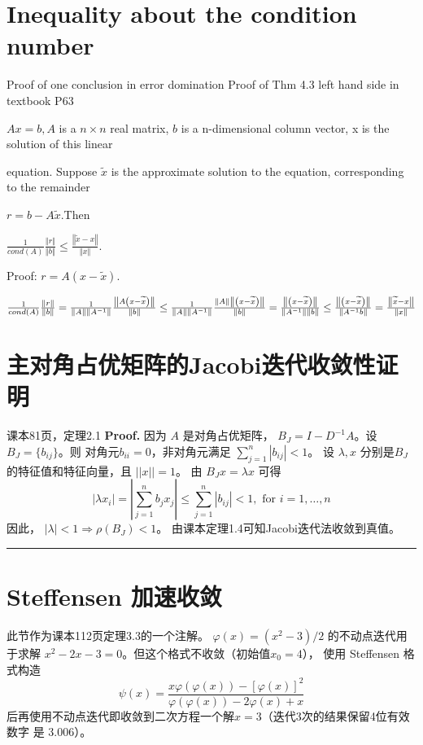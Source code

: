\documentclass{article}
\newenvironment{proof}[1][Proof]{\noindent\textbf{#1.} }{\ \rule{0.5em}{0.5em}}
\begin{document}
\section{Inequality about the condition number}
Proof of one conclusion in error domination
Proof of Thm 4.3 left hand side in textbook P63

$Ax=b,A$ is a $n\times n$ real matrix, $b$ is a n-dimensional column vector,
x is the solution of this linear

equation. Suppose $\widetilde{x}$ is the approximate solution to the
equation, corresponding to the remainder 

$r=b-A\widetilde{x}.$Then 

$\frac{1}{cond(A)}\frac{\left\Vert r\right\Vert }{\left\Vert b\right\Vert }%
\leq \frac{\left\Vert \widetilde{x}-x\right\Vert }{\left\Vert x\right\Vert }.
$

Proof: $r=A\left( x-\widetilde{x}\right) .$

$\frac{1}{cond(A)}\frac{\left\Vert r\right\Vert }{\left\Vert b\right\Vert }=%
\frac{1}{\left\Vert A\right\Vert \left\Vert A^{-1}\right\Vert }\frac{%
\left\Vert A\left( x-\widetilde{x}\right) \right\Vert }{\left\Vert
b\right\Vert }\leq \frac{1}{\left\Vert A\right\Vert \left\Vert
A^{-1}\right\Vert }\frac{\left\Vert A\right\Vert \left\Vert \left( x-%
\widetilde{x}\right) \right\Vert }{\left\Vert b\right\Vert }=\frac{%
\left\Vert \left( x-\widetilde{x}\right) \right\Vert }{\left\Vert
A^{-1}\right\Vert \left\Vert b\right\Vert }\leq \frac{\left\Vert \left( x-%
\widetilde{x}\right) \right\Vert }{\left\Vert A^{-1}b\right\Vert }=\frac{%
\left\Vert \widetilde{x}-x\right\Vert }{\left\Vert x\right\Vert }$

\section{主对角占优矩阵的Jacobi迭代收敛性证明}
课本81页，定理2.1
\begin{proof}
因为 $A$ 是对角占优矩阵，
$B_J=I-D^{-1}A$。设$B_J=\{b_{ij}\}$。则
对角元$b_{ii}=0$，非对角元满足
$\sum_{j=1}^{n} |b_{ij}| < 1$。
设 $\lambda, x$ 分别是$B_J$的特征值和特征向量，且
$||x||=1$。
由 $B_J x = \lambda x$ 可得
\begin{equation*}
    |\lambda x_i| = |\sum_{j=1}^n b_j x_j| 
    \leq \sum_{j=1}^{n} |b_{ij}| < 1, \textrm{ for } i=1,\dots, n
\end{equation*}
因此， $|\lambda|<1 \Rightarrow \rho(B_J)<1$。
由课本定理1.4可知Jacobi迭代法收敛到真值。
\end{proof}
\section{Steffensen 加速收敛}
此节作为课本112页定理3.3的一个注解。
$\varphi(x) = (x^2-3)/2$ 的不动点迭代用于求解
$x^2-2x-3=0$。但这个格式不收敛（初始值$x_0=4$），
使用
Steffensen 格式构造
\begin{equation}
    \psi(x) =     \frac{x\varphi(\varphi(x))
    - [\varphi(x)]^2}
    {\varphi(\varphi(x)) - 2\varphi(x) + x}
\end{equation}
后再使用不动点迭代即收敛到二次方程一个解$x=3$（迭代3次的结果保留4位有效数字
是 3.006）。
\end{document}
